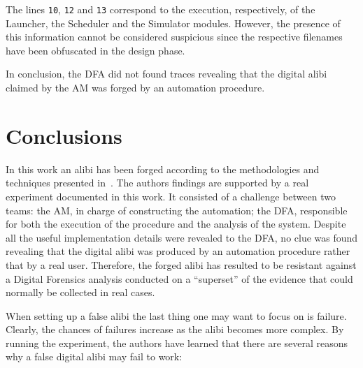 \documentclass[10pt, conference]{IEEEtran}
\begin{document}
The lines \verb=10=, \verb=12= and \verb=13= correspond to the execution, respectively, of the Launcher, the Scheduler and the Simulator modules. However, the presence of this information cannot be considered suspicious since the respective filenames have been obfuscated in the design phase.

In conclusion, the DFA did not found traces revealing that the digital alibi claimed by the AM was forged by an automation procedure.



\section{Conclusions}
\label{sec:conclusions}

In this work an alibi has been forged according to the methodologies and techniques presented in~\cite{autoalibi}.
The authors findings are supported by a real experiment documented in this work. It consisted of a challenge between two teams: the AM, in charge of constructing the automation; the DFA, responsible for both the execution of the procedure and the analysis of the system.
Despite all the useful implementation details were revealed to the DFA, no clue was found revealing that the digital alibi was produced by an automation procedure rather that by a real user. Therefore, the forged alibi has resulted to be resistant against a Digital Forensics analysis conducted on  a ``superset'' of the evidence that could normally be collected in real cases.

When setting up a false alibi the last thing one may want to focus on is failure. Clearly, the chances of failures increase as the alibi becomes more complex. By running the experiment, the authors have learned that there are several reasons why a false digital alibi may fail to work:
\end{document}
